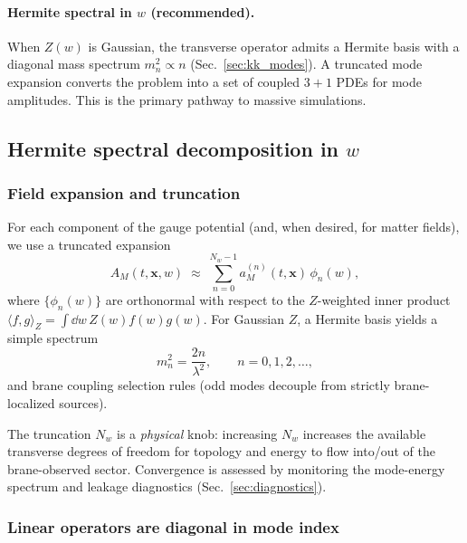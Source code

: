 \documentclass[11pt]{article}
\newcommand{\x}{\mathbf{x}}     %
\newcommand{\A}{A}              %
\newcommand{\Z}{Z}              %
\newcommand{\phin}{\phi_n}
\begin{document}
\paragraph{Hermite spectral in \(w\) (recommended).}
When \(\Z(w)\) is Gaussian, the transverse operator admits a Hermite basis with a
diagonal mass spectrum \(m_n^2\propto n\) (Sec.~\ref{sec:kk_modes}). A truncated
mode expansion converts the problem into a set of coupled \(3+1\) PDEs for mode
amplitudes. This is the primary pathway to massive simulations.

\subsection{Hermite spectral decomposition in \texorpdfstring{$w$}{w}}
\label{sec:hermite_scheme}

\subsubsection*{Field expansion and truncation}

For each component of the gauge potential (and, when desired, for matter fields),
we use a truncated expansion
\begin{equation}
\A_M(t,\x,w) \;\approx\; \sum_{n=0}^{N_w-1} a_M^{(n)}(t,\x)\,\phin(w),
\label{eq:Aw_mode_expand}
\end{equation}
where \(\{\phin(w)\}\) are orthonormal with respect to the \(\Z\)-weighted inner
product\\
\(\langle f,g\rangle_{\Z}=\int \dd w\,\Z(w)f(w)g(w)\). For Gaussian \(\Z\),
a Hermite basis yields a simple spectrum
\begin{equation}
m_n^2 = \frac{2n}{\lambda^2},
\qquad n=0,1,2,\ldots,
\label{eq:mn_spectrum_repeat}
\end{equation}
and brane coupling selection rules (odd modes decouple from strictly brane-localized
sources).

The truncation \(N_w\) is a \emph{physical} knob: increasing \(N_w\) increases the
available transverse degrees of freedom for topology and energy to flow into/out
of the brane-observed sector. Convergence is assessed by monitoring the mode-energy
spectrum and leakage diagnostics (Sec.~\ref{sec:diagnostics}).

\subsubsection*{Linear operators are diagonal in mode index}
\end{document}
